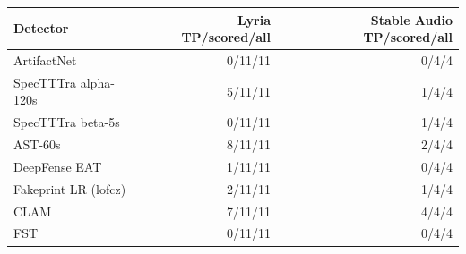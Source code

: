 \begin{tabular}{lrr}
\toprule
Detector & Lyria TP/scored/all & Stable Audio TP/scored/all \\
\midrule
ArtifactNet & 0/11/11 & 0/4/4 \\
SpecTTTra alpha-120s & 5/11/11 & 1/4/4 \\
SpecTTTra beta-5s & 0/11/11 & 1/4/4 \\
AST-60s & 8/11/11 & 2/4/4 \\
DeepFense EAT & 1/11/11 & 0/4/4 \\
Fakeprint LR (lofcz) & 2/11/11 & 1/4/4 \\
CLAM & 7/11/11 & 4/4/4 \\
FST & 0/11/11 & 0/4/4 \\
\bottomrule
\end{tabular}
